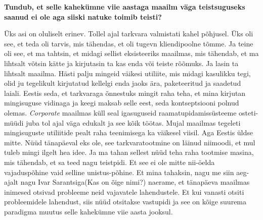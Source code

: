 \textbf{Tundub, et selle kahekümne viie aastaga maailm väga teistsuguseks saanud ei ole aga siiski natuke toimib teisti?}

Üks asi on oluliselt erinev. Tollel ajal tarkvara valmistati kahel põhjusel. Üks oli see, et teda oli tarvis, mis tähendas, et  oli tugevn kliendipoolne tõmme. Ja teine oli see, et ma tahtsin, et midagi sellist eksisteeriks maailmas, mis tähendab, et ma lihtsalt võtsin kätte ja kirjutasin ta kas enda või teiste rõõmuks. Ja lasin ta lihtsalt maailma. Hästi palju mingeid väikesi utiliite, mis midagi kasulikku tegi, olid ju tegelikult kirjutatud kellelgi enda jaoks ära, paketeeritud ja saadetud laiali. Eestis seda, et tarkvaraga õnnestuks mingit raha teha, et mina kirjutan mingisuguse vidinaga ja keegi maksab selle eest, seda kontseptsiooni polnud olemas. \emph{Corporate} maailmas küll seal igasuguseid  raamatupidamissüsteeme osteti-müüdi juba tol ajal väga edukalt ja see kõik töötas. Mujal maailmas tegeleti mingisuguste utiliitide pealt raha teenimisega ka väikesel viisil. Aga Eestis üldse mitte. Nüüd tänapäeval eks ole, see tarkvaratootmine on läinud niimoodi, et mul tuleb mingi ilgelt hea idee. Ja ma tahan sellest nüüd teha raha tootmise masina, mis tähendab, et sa teed nagu teistpidi. Et see ei ole mitte nii-öelda vajaduspõhine vaid selline unistus-põhine. Et mina tahaksin, nagu me siin aeg-ajalt nagu Ivar Sarantsiga(Kas on õige nimi?) naerame, et tänapäeva maailmas  inimesed  otsivad probleeme neid vajavatele lahendustele. Et kui vanasti otsiti probleemidele lahendust, siis nüüd otsitakse vastupidi ja see on  kõige suurema paradigma muutus selle kahekümne viie aasta jooksul.
